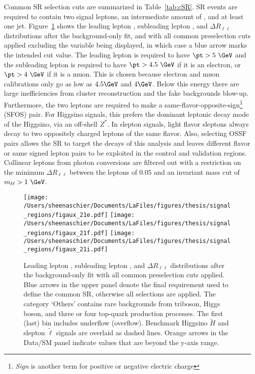  Common SR selection cuts are summarized in Table~\ref{tab:cSR}.  SR events are required to contain two signal leptons, an intermediate amount of \met, and at least one jet.  Figure~\ref{fig:sr:cm1} shows the leading lepton \pt, subleading lepton \pt, and $\Delta R_{\ell\ell}$ distributions after the background-only fit, and with all common preselection cuts applied excluding the variable being displayed, in which case a blue arrow marks the intended cut value.  The leading lepton is required to have $\pt > 5~\GeV$ and the subleading lepton is required to have $\pt > 4.5~\GeV$ if it is an electron, or $\pt > 4~\GeV$ if it is a muon.  This is chosen because electron and muon calibrations only go as low as $4.5\GeV$ and $4\GeV$.  Below this energy there are large inefficiencies from cluster reconstruction and the fake backgrounds blow-up.  Furthermore, the two leptons are required to make a same-flavor-opposite-sign\footnote{\textit{Sign} is another term for positive or negative electric charge} (SFOS) pair.  For Higgsino signals, this prefers the dominant leptonic decay mode of the Higgsino, via an off-shell $Z^*$.  In slepton signals, light flavor sleptons always decay to two oppositely charged leptons of the same flavor.  Also, selecting OSSF pairs allows the SR to target the decays of this analysis and leaves different flavor or same signed lepton pairs to be exploited in the control and validation regions.  Collinear leptons from photon conversions are filtered out with a restriction on the minimum $\Delta R_{\ell\ell}$ between the leptons of $0.05$ and an invariant mass cut of $m_{\ell\ell} > 1 ~\GeV$.  
   \begin{figure}%
  \begin{center}
  \texttt{[image: /Users/sheenaschier/Documents/LaFiles/figures/thesis/signal\_regions/figaux\_21e.pdf]}
   \texttt{[image: /Users/sheenaschier/Documents/LaFiles/figures/thesis/signal\_regions/figaux\_21f.pdf]}
      \texttt{[image: /Users/sheenaschier/Documents/LaFiles/figures/thesis/signal\_regions/figaux\_21i.pdf]}
   \end{center}
 \caption{Leading lepton \pt, subleading lepton \pt, and $\Delta R_{\ell\ell}$ distributions after the background-only fit with all common preselection cuts applied.  Blue arrows in the upper panel denote the final requirement used to define the common SR, otherwise all selections are applied. The category `Others' contains rare backgrounds from triboson, Higgs boson, and three or four top-quark production processes. The first (last) bin includes underflow (overflow).  Benchmark Higgsino $\tilde H$ and slepton $\tilde\ell$ signals are overlaid as dashed lines. Orange arrows in the Data/SM panel indicate values that are beyond the y-axis range.}
 \label{fig:sr:cm1}
 \end{figure}
 
